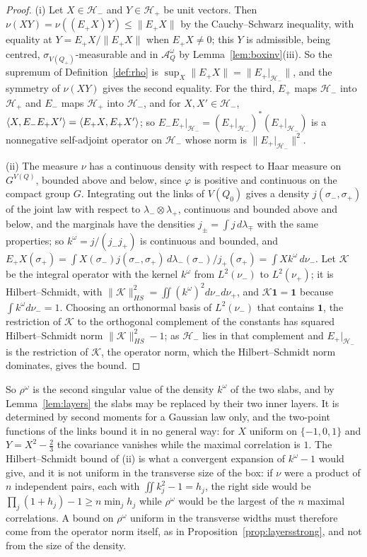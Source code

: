 \begin{proof}
(i) Let $X\in\mathcal H_-$ and $Y\in\mathcal H_+$ be unit vectors. Then
$\nu(XY)=\nu((E_+X)Y)\le\|E_+X\|$ by the Cauchy--Schwarz inequality, with
equality at $Y=E_+X/\|E_+X\|$ when $E_+X\ne0$; this $Y$ is admissible, being
centred, $\sigma_{V(Q_+)}$-measurable and in $\mathcal A^\omega_Q$ by
Lemma~\ref{lem:boxinv}(iii). So the supremum of Definition~\ref{def:rho} is
$\sup_X\|E_+X\|=\|E_+|_{\mathcal H_-}\|$, and the symmetry of $\nu(XY)$ gives
the second equality. For the third, $E_+$ maps $\mathcal H_-$ into
$\mathcal H_+$ and $E_-$ maps $\mathcal H_+$ into $\mathcal H_-$, and for
$X,X'\in\mathcal H_-$, $\langle X,E_-E_+X'\rangle=\langle E_+X,E_+X'\rangle$; so $E_-E_+|_{
\mathcal H_-}=(E_+|_{\mathcal H_-})^*(E_+|_{\mathcal H_-})$ is a nonnegative
self-adjoint operator on $\mathcal H_-$ whose norm is $\|E_+|_{\mathcal
H_-}\|^2$.

(ii) The measure $\nu$ has a continuous density with respect to Haar
measure on $G^{V(Q)}$, bounded above and below, since $\varphi$ is positive
and continuous on the compact group $G$. Integrating out the links of
$V(Q_0)$ gives a density $j(\sigma_-,\sigma_+)$ of the joint law with respect
to $\lambda_-\otimes\lambda_+$, continuous and bounded above and below, and
the marginals have the densities $j_\pm=\int j\,d\lambda_\mp$ with the same
properties; so $k^\omega=j/(j_-j_+)$ is continuous and bounded, and
$E_+X(\sigma_+)=\int X(\sigma_-)j(\sigma_-,\sigma_+)\,d\lambda_-(\sigma_-)/
j_+(\sigma_+)=\int Xk^\omega\,d\nu_-$. Let $\mathcal K$ be the integral
operator with the kernel $k^\omega$ from $L^2(\nu_-)$ to $L^2(\nu_+)$; it is
Hilbert--Schmidt, with $\|\mathcal K\|_{HS}^2=\iint(k^\omega)^2d\nu_-d\nu_+$,
and $\mathcal K\mathbf1=\mathbf1$ because $\int k^\omega d\nu_-=1$. Choosing
an orthonormal basis of $L^2(\nu_-)$ that contains $\mathbf1$, the
restriction of $\mathcal K$ to the orthogonal complement of the constants
has squared Hilbert--Schmidt norm $\|\mathcal K\|_{HS}^2-1$; as $\mathcal
H_-$ lies in that complement and $E_+|_{\mathcal H_-}$ is the restriction of
$\mathcal K$, the operator norm, which the Hilbert--Schmidt norm dominates,
gives the bound.
\end{proof}

So $\rho^\omega$ is the second singular value of the density $k^\omega$ of
the two slabs, and by Lemma~\ref{lem:layers} the slabs may be replaced by
their two inner layers. It is determined by second moments for a Gaussian
law only, and the two-point functions of the links bound it in no general
way: for $X$ uniform on $\{-1,0,1\}$ and $Y=X^2-\frac23$ the covariance
vanishes while the maximal correlation is $1$. The Hilbert--Schmidt bound of
(ii) is what a convergent expansion of $k^\omega-1$ would give, and it is
not uniform in the transverse size of the box: if $\nu$ were a product of
$n$ independent pairs, each with $\iint k_j^2-1=h_j$, the right side would
be $\prod_j(1+h_j)-1\ge n\min_jh_j$ while $\rho^\omega$ would be the largest
of the $n$ maximal correlations. A bound on $\rho^\omega$ uniform in the
transverse widths must therefore come from the operator norm itself, as in
Proposition~\ref{prop:layersstrong}, and not from the size of the density.

